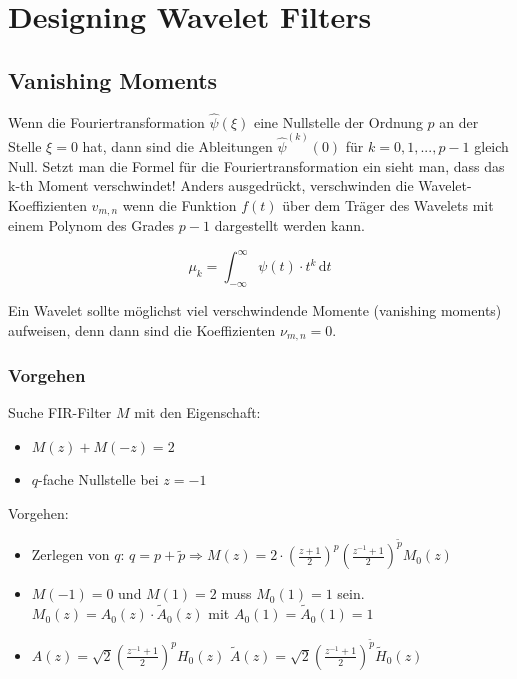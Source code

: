 \section{Designing Wavelet Filters}

\subsection{Vanishing Moments}
 Wenn die Fouriertransformation $\hat{\psi}(\xi)$ eine Nullstelle der Ordnung $p$ an der Stelle $\xi = 0$ hat, dann sind die Ableitungen $\hat{\psi}^{(k)}(0)$ für $k=0,1,...,p-1$ gleich Null. Setzt man die Formel für die Fouriertransformation ein sieht man, dass das k-th Moment verschwindet! Anders ausgedrückt, verschwinden die Wavelet-Koeffizienten $v_{m,n}$ wenn die Funktion $f(t)$ über dem Träger des Wavelets mit einem Polynom des Grades $p-1$ dargestellt werden kann. 

\[ 
	\mu_k = \int_{-\infty}^{\infty} \psi(t) \cdot t^k \, \mathrm{d}t
\]

Ein Wavelet sollte möglichst viel verschwindende Momente (vanishing moments) aufweisen, denn dann sind die Koeffizienten $\nu_{m,n} = 0$.


\subsubsection{Vorgehen}
Suche FIR-Filter $M$ mit den Eigenschaft: 

\vspace{-0.4cm}

\begin{itemize}
	\itemsep-0.2cm
	\item $M(z) + M(-z)=2$
	\item $q$-fache Nullstelle bei $z=-1$
\end{itemize}

Vorgehen:

\vspace{-0.4cm}

\begin{itemize}
	\itemsep-0.2cm
	\item Zerlegen von $q$: $q = p + \tilde{p} \Rightarrow M(z)=2\cdot (\frac{z+1}{2})^p (\frac{z^{-1}+1}{2})^{\tilde{p}}M_0(z)$
	\item $M(-1)=0$ und $M(1) = 2$ muss $M_0(1)=1$ sein. $M_0(z) = A_0(z) \cdot \tilde{A}_0(z)$ mit $A_0(1)=\tilde{A}_0(1) = 1$
	\item $A(z) = \sqrt{2}(\frac{z^{-1}+1}{2})^p H_0(z)$ \qquad $\tilde{A}(z) = \sqrt{2}(\frac{z^{-1}+1}{2})^{\tilde{p}} \tilde{H}_0(z)$
\end{itemize}



